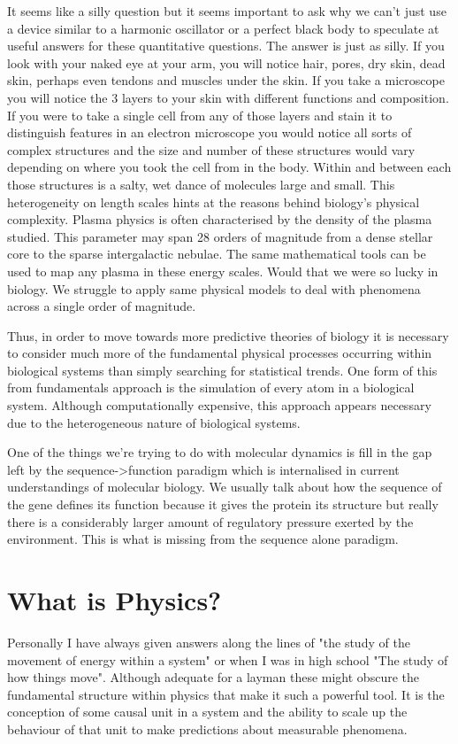 It seems like a silly question but it seems important to ask why we can't just use a device similar to a harmonic oscillator or a perfect black body to speculate at useful answers for these quantitative questions. The answer is just as silly. If you look with your naked eye at your arm, you will notice hair, pores, dry skin, dead skin, perhaps even tendons and muscles under the skin. If you take a microscope you will notice the 3 layers to your skin with different functions and composition. If you were to take a single cell from any of those layers and stain it to distinguish features in an electron microscope you would notice all sorts of complex structures and the size and number of these structures would vary depending on where you took the cell from in the body. Within and between each those structures is a salty, wet dance of molecules large and small. This heterogeneity on length scales hints at the reasons behind biology's physical complexity. Plasma physics is often characterised by the density of the plasma studied. This parameter may span 28 orders of magnitude from a dense stellar core to the sparse intergalactic nebulae. The same mathematical tools can be used to map any plasma in these energy scales. Would that we were so lucky in biology. We struggle to apply same physical models to deal with phenomena across a single order of magnitude.  

Thus, in order to move towards more predictive theories of biology it is necessary to consider much more of the fundamental physical processes occurring within biological systems than simply searching for statistical trends. One form of this from fundamentals approach is the simulation of every atom in a biological system. Although computationally expensive, this approach appears necessary due to the heterogeneous nature of biological systems. 

One of the things we're trying to do with molecular dynamics is fill in the gap left by the sequence->function paradigm which is internalised in current understandings of molecular biology. We usually talk about how the sequence of the gene defines its function because it gives the protein its structure but really there is a considerably larger amount of regulatory pressure exerted by the environment. This is what is missing from the sequence alone paradigm.

\section{What is Physics?}
Personally I have always given answers along the lines of "the study of the movement of energy within a system" or when I was in high school "The study of how things move". Although adequate for a layman these might obscure the fundamental structure within physics that make it such a powerful tool. It is the conception of some causal unit in a system and the ability to scale up the behaviour of that unit to make predictions about measurable phenomena.

